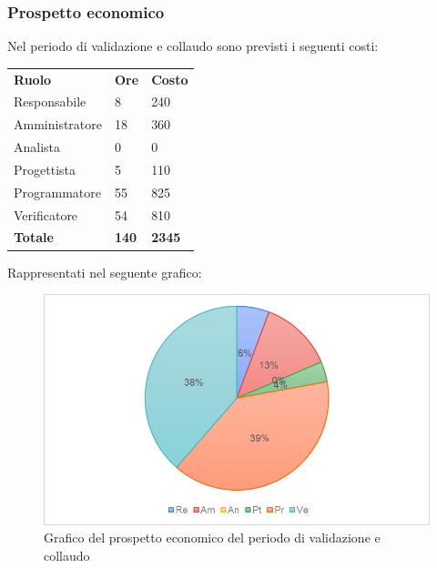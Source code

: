 \subsubsection{Prospetto economico}
Nel periodo di validazione e collaudo sono previsti i seguenti costi:
\begin{longtable} {
		>{}p{32mm}
		>{}p{20mm}
		>{}p{20mm}
	}
	\rowcolor{gray!50}
	
	\textbf{Ruolo} & \textbf{Ore} & \textbf{Costo} \TBstrut \\
	Responsabile & 8 & 240 \TBstrut \\
	Amministratore & 18 & 360 \TBstrut \\
	Analista & 0 & 0 \TBstrut \\
	Progettista & 5 & 110 \TBstrut \\
	Programmatore & 55 & 825 \TBstrut \\
	Verificatore & 54 & 810 \TBstrut \\
	\textbf{Totale} & \textbf{140}& \textbf{2345} \TBstrut \\		
\end{longtable}
Rappresentati nel seguente grafico: \\

\begin{figure} [h!]
	\includegraphics[width=\linewidth]{./img/Grafici/8.png}
	\caption{Grafico del prospetto economico del periodo di validazione e collaudo}
\end{figure}


	

